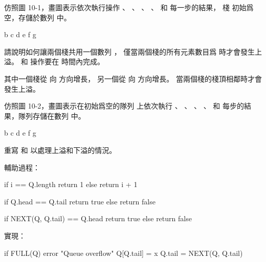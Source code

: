 \startsection[
  reference=section:stack_and_queue,
  title={Stacks and queues},
]

\startEXERCISE
仿照圖 10-1，畫圖表示依次執行操作 、 、 、
 、   和  每一步的結果，
棧  初始爲空，存儲於數列  中。
\stopEXERCISE

\startANSWER
{}
{\externalfigure[output/e10_1_1-2]}{b}
{\externalfigure[output/e10_1_1-3]}{c}
{\externalfigure[output/e10_1_1-4]}{d}
{\externalfigure[output/e10_1_1-5]}{e}
{\externalfigure[output/e10_1_1-6]}{f}
{\externalfigure[output/e10_1_1-7]}{g}
\stopcombination
\stopANSWER

\startEXERCISE
請說明如何讓兩個棧共用一個數列 ，
僅當兩個棧的所有元素數目爲  時才會發生上溢。
  和  操作要在  時間內完成。
\stopEXERCISE

\startANSWER
其中一個棧從  向  方向增長，
另一個從  向  方向增長。
當兩個棧的棧頂相鄰時才會發生上溢。
\stopANSWER

\startEXERCISE
仿照圖 10-2，畫圖表示在初始爲空的隊列  上依次執行 、
 、 、 、
  和  每步的結果，隊列存儲在數列  中。
\stopEXERCISE

\startANSWER
{}
{\externalfigure[output/e10_1_3-2]}{b}
{\externalfigure[output/e10_1_3-3]}{c}
{\externalfigure[output/e10_1_3-4]}{d}
{\externalfigure[output/e10_1_3-5]}{e}
{\externalfigure[output/e10_1_3-6]}{f}
{\externalfigure[output/e10_1_3-7]}{g}
\stopcombination
\stopANSWER

\startEXERCISE
重寫  和  以處理上溢和下溢的情況。
\stopEXERCISE

\startANSWER
輔助過程：

\startCLRS
if i == Q.length
	return 1
else
	return i + 1
\stopCLRS

\startCLRS
if Q.head == Q.tail
	return true
else
	return false
\stopCLRS

\startCLRS
if NEXT(Q, Q.tail) == Q.head
	return true
else
	return false
\stopCLRS

實現：

\startCLRS
if FULL(Q)
	error "Queue overflow"
Q[Q.tail] = x
Q.tail = NEXT(Q, Q.tail)
\stopCLRS

